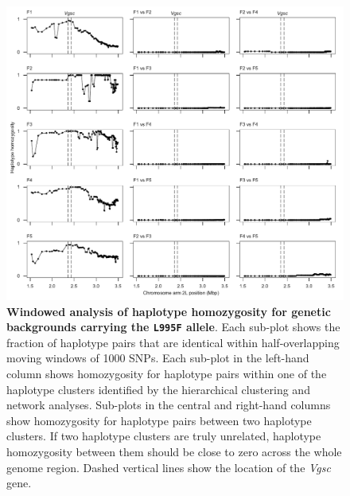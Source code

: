 \documentclass[a4paper,11pt,abstracton,hidelinks]{scrartcl}
\begin{document}
%
\begin{figure}[!b]
  \includegraphics[width=1.1\linewidth,center]{artwork/mhh_F.pdf}
  \caption{\textbf{Windowed analysis of haplotype homozygosity for genetic backgrounds carrying the \texttt{L995F} allele}. Each sub-plot shows the fraction of haplotype pairs that are identical within half-overlapping moving windows of 1000 SNPs. Each sub-plot in the left-hand column shows homozygosity for haplotype pairs within one of the haplotype clusters identified by the hierarchical clustering and network analyses. Sub-plots in the central and right-hand columns show homozygosity for haplotype pairs between two haplotype clusters. If two haplotype clusters are truly unrelated, haplotype homozygosity between them should be close to zero across the whole genome region. Dashed vertical lines show the location of the \textit{Vgsc} gene.}
  \label{fig:mhh_f}
\end{figure}

\clearpage
\end{document}
